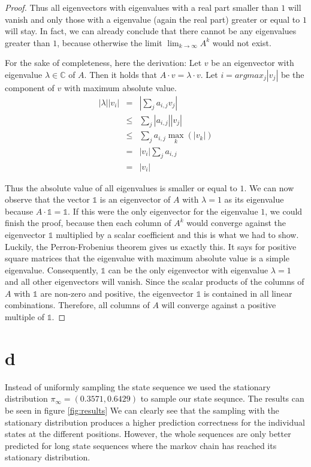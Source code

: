 \documentclass[a4paper, 12pt, titlepage]{article}
\begin{document}
\begin{proof}
Thus all eigenvectors with eigenvalues with a real part smaller than $1$ will vanish and only those with a eigenvalue (again the real part) greater or equal to $1$ will stay.
In fact, we can already conclude that there cannot be any eigenvalues greater than $1$, because otherwise the limit $\lim_{k\rightarrow \infty} A^k$ would not exist.

For the sake of completeness, here the derivation:
Let $v$ be an eigenvector with eigenvalue $\lambda \in \mathds{C}$ of $A$.
Then it holds that $A\cdot v=\lambda \cdot v$.
Let $i=argmax_{j} |v_{j}|$ be the component of $v$ with maximum absolute value.
\begin{eqnarray*}
	|\lambda| |v_{i}| &=&| \sum_{j} a_{i,j} v_{j} |\\
	&\le& \sum_{j} |a_{i,j}||v_{j}| \\
	&\le& \sum_{j} a_{i,j} \max_{k}(|v_{k}|)\\
	&=& |v_{i}| \sum_{j} a_{i,j}\\
	&=& |v_{i}|
\end{eqnarray*}

Thus the absolute value of all eigenvalues is smaller or equal to $1$.
We can now observe that the vector $\mathds{1}$ is an eigenvector of $A$ with $\lambda=1$ as its eigenvalue because $A \cdot \mathds{1} = \mathds{1}$.
If this were the only eigenvector for the eigenvalue $1$, we could finish the proof, because then each column of $A^k$ would converge against the eigenvector $\mathds{1}$ multiplied by a scalar coefficient and this is what we had to show.
Luckily, the Perron-Frobenius theorem gives us exactly this.
It says for positive square matrices that the eigenvalue with maximum absolute value is a simple eigenvalue.
Consequently, $\mathds{1}$ can be the only eigenvector with eigenvalue $\lambda=1$ and all other eigenvectors will vanish.
Since the scalar products of the columns of $A$ with $\mathds{1}$ are non-zero and positive, the eigenvector $\mathds{1}$ is contained in all linear combinations.
Therefore, all columns of $A$ will converge against a positive multiple of $\mathds{1}$.

\end{proof}

\section*{d}

Instead of uniformly sampling the state sequence we used the stationary distribution $\pi_{\infty} = (0.3571,0.6429)$ to sample our state sequnce. The results can be seen in figure \ref{fig:results}
We can clearly see that the sampling with the stationary distribution produces a higher prediction correctness for the individual states at the different positions.
However, the whole sequences are only better predicted for long state sequences where the markov chain has reached its stationary distribution.
\end{document}

